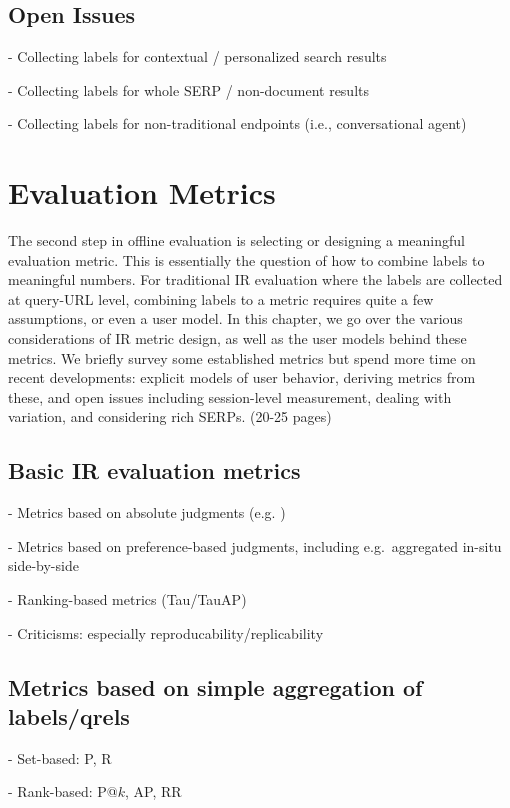 \documentclass[openany]{now} %
\begin{document}
\section{Open Issues}

- Collecting labels for contextual / personalized search results

- Collecting labels for whole SERP / non-document results

- Collecting labels for non-traditional endpoints (i.e., conversational agent)

\chapter{Evaluation Metrics}
\label{c-metrics}

The second step in offline evaluation is selecting or designing a meaningful evaluation metric. This is essentially the question of how to combine labels to meaningful numbers. For traditional IR evaluation where the labels are collected at query-URL level, combining labels to a metric requires quite a few assumptions, or even a user model. In this chapter, we go over the various considerations of IR metric design, as well as the user models behind these metrics. We briefly survey some established metrics but spend more time on recent developments: explicit models of user behavior, deriving metrics from these, and open issues including session-level measurement, dealing with variation, and considering rich SERPs. (20-25 pages)

\section{Basic IR evaluation metrics}

- Metrics based on absolute judgments (e.g. \cite{cooper73selecting})

- Metrics based on preference-based judgments, including e.g.\ aggregated in-situ side-by-side \cite{Thomas2006}

- Ranking-based metrics (Tau/TauAP)

- Criticisms: especially reproducability/replicability

\section{Metrics based on simple aggregation of labels/qrels}

- Set-based: P, R

- Rank-based: P@$k$, AP, RR
\end{document}
